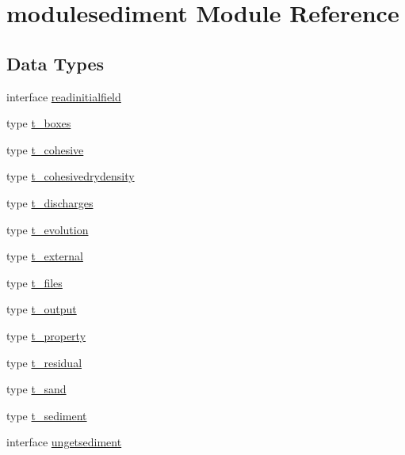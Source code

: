\hypertarget{namespacemodulesediment}{}\section{modulesediment Module Reference}
\label{namespacemodulesediment}
\subsection*{Data Types}
\begin{DoxyCompactItemize}
\item 
interface \mbox{\hyperlink{interfacemodulesediment_1_1readinitialfield}{readinitialfield}}
\item 
type \mbox{\hyperlink{structmodulesediment_1_1t__boxes}{t\+\_\+boxes}}
\item 
type \mbox{\hyperlink{structmodulesediment_1_1t__cohesive}{t\+\_\+cohesive}}
\item 
type \mbox{\hyperlink{structmodulesediment_1_1t__cohesivedrydensity}{t\+\_\+cohesivedrydensity}}
\item 
type \mbox{\hyperlink{structmodulesediment_1_1t__discharges}{t\+\_\+discharges}}
\item 
type \mbox{\hyperlink{structmodulesediment_1_1t__evolution}{t\+\_\+evolution}}
\item 
type \mbox{\hyperlink{structmodulesediment_1_1t__external}{t\+\_\+external}}
\item 
type \mbox{\hyperlink{structmodulesediment_1_1t__files}{t\+\_\+files}}
\item 
type \mbox{\hyperlink{structmodulesediment_1_1t__output}{t\+\_\+output}}
\item 
type \mbox{\hyperlink{structmodulesediment_1_1t__property}{t\+\_\+property}}
\item 
type \mbox{\hyperlink{structmodulesediment_1_1t__residual}{t\+\_\+residual}}
\item 
type \mbox{\hyperlink{structmodulesediment_1_1t__sand}{t\+\_\+sand}}
\item 
type \mbox{\hyperlink{structmodulesediment_1_1t__sediment}{t\+\_\+sediment}}
\item 
interface \mbox{\hyperlink{interfacemodulesediment_1_1ungetsediment}{ungetsediment}}
\end{DoxyCompactItemize}
